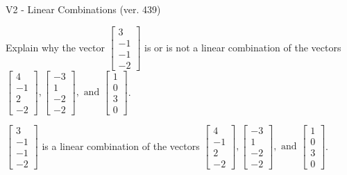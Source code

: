 \begin{exercise}
  \begin{exerciseTitle}V2 - Linear Combinations (ver. 439)\end{exerciseTitle}
  \begin{exerciseStatement}
    Explain why the vector \(\left[\begin{array}{c}
3 \\
-1 \\
-1 \\
-2
\end{array}\right]\)  is or is not a linear 
	combination of the vectors \(\left[\begin{array}{c}
4 \\
-1 \\
2 \\
-2
\end{array}\right] , \left[\begin{array}{c}
-3 \\
1 \\
-2 \\
-2
\end{array}\right] , \text{ and } \left[\begin{array}{c}
1 \\
0 \\
3 \\
0
\end{array}\right]\).
	


  \end{exerciseStatement}
  \begin{exerciseAnswer}
   \(\left[\begin{array}{c}
3 \\
-1 \\
-1 \\
-2
\end{array}\right]\) 
  	 is  
	a linear combination of the vectors \(\left[\begin{array}{c}
4 \\
-1 \\
2 \\
-2
\end{array}\right] , \left[\begin{array}{c}
-3 \\
1 \\
-2 \\
-2
\end{array}\right] , \text{ and } \left[\begin{array}{c}
1 \\
0 \\
3 \\
0
\end{array}\right]\).

	
  


  \end{exerciseAnswer}
\end{exercise}